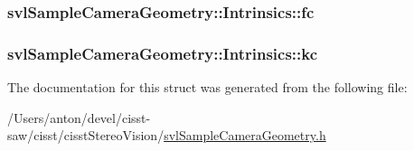 \subsubsection[{fc}]{ svl\+Sample\+Camera\+Geometry\+::\+Intrinsics\+::fc}\label{structsvl_sample_camera_geometry_1_1_intrinsics_a695218668b61d9a523078479ffa9f336}
\hypertarget{structsvl_sample_camera_geometry_1_1_intrinsics_a6c912ef66be611a6d9815e1910b27f4f}{}
\subsubsection[{kc}]{ svl\+Sample\+Camera\+Geometry\+::\+Intrinsics\+::kc}\label{structsvl_sample_camera_geometry_1_1_intrinsics_a6c912ef66be611a6d9815e1910b27f4f}


The documentation for this struct was generated from the following file\+:\begin{DoxyCompactItemize}
\item 
/\+Users/anton/devel/cisst-\/saw/cisst/cisst\+Stereo\+Vision/\hyperlink{svl_sample_camera_geometry_8h}{svl\+Sample\+Camera\+Geometry.\+h}\end{DoxyCompactItemize}

